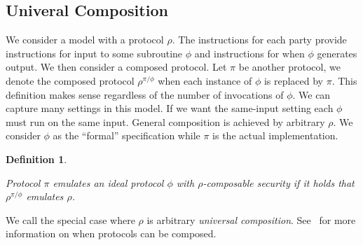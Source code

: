 \documentclass{article}
\newtheorem{defn}[thm]{Definition}
\newenvironment{definition}{\begin{defn}\begin{em}}%
{\end{em}\end{defn}}
\begin{document}
\subsection{Univeral Composition}
We consider a model with a protocol $\rho$.  The instructions for each party provide instructions for input to some subroutine $\phi$ and instructions for when $\phi$ generates output.  We then consider a composed protocol.  Let $\pi$ be another protocol, we denote the composed protocol $\rho^{\pi/\phi}$ when each instance of $\phi$ is replaced by $\pi$.  This definition makes sense regardless of the number of invocations of $\phi$.  We can capture many settings in this model.  If we want the same-input setting each $\phi$ must run on the same input.  General composition is achieved by arbitrary $\rho$.  We consider $\phi$ as the ``formal'' specification while $\pi$ is the actual implementation.
\begin{definition}
Protocol $\pi$ emulates an ideal protocol $\phi$ with $\rho$-composable security if it holds that $\rho^{\pi/\phi}$ emulates $\rho$.
\end{definition}
We call the special case where $\rho$ is arbitrary \emph{universal composition}.  See~\cite{canettiTutorial} for more information on when protocols can be composed.


\end{document}
